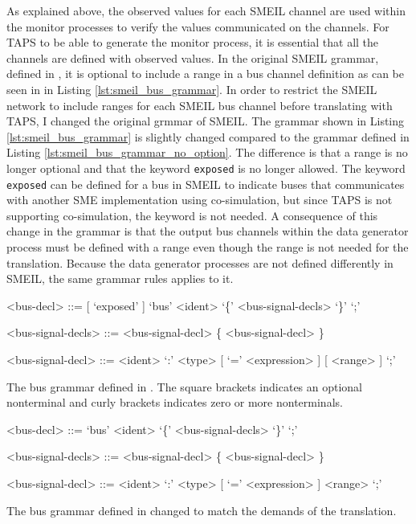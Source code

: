 As explained above, the observed values for each SMEIL channel are used within the monitor processes to verify the values communicated on the channels. For TAPS to be able to generate the monitor process, it is essential that all the channels are defined with observed values. In the original SMEIL grammar, defined in \cite{Asheim2018}, it is optional to include a range in a bus channel definition as can be seen in in Listing \ref{lst:smeil_bus_grammar}.
In order to restrict the SMEIL network to include ranges for each SMEIL bus channel before translating with TAPS, I changed the original grmmar of SMEIL. The grammar shown in Listing \ref{lst:smeil_bus_grammar} is slightly changed compared to the grammar defined in Listing \ref{lst:smeil_bus_grammar_no_option}. The difference is that a range is no longer optional and that the keyword \texttt{exposed} is no longer allowed. The keyword \texttt{exposed} can be defined for a bus in SMEIL to indicate buses that communicates with another SME implementation using co-simulation, but since TAPS is not supporting co-simulation, the keyword is not needed. A consequence of this change in the grammar is that the output bus channels within the data generator process must be defined with a range even though the range is not needed for the translation. Because the data generator processes are not defined differently in SMEIL, the same grammar rules applies to it.
\begin{listing}
    \begin{grammar}
    <bus-decl> ::= [ `exposed' ] `bus' <ident> `\{' <bus-signal-decls> `\}'  `;'

    <bus-signal-decls> ::= <bus-signal-decl> \{ <bus-signal-decl> \}

    <bus-signal-decl> ::= <ident> `:' <type> [ `=' <expression> ] [ <range> ] `;'
    \end{grammar}
    \caption{The bus grammar defined in \cite{Asheim2018}. The square brackets indicates an optional nonterminal and curly brackets indicates zero or more nonterminals.}
    \label{lst:smeil_bus_grammar}
\end{listing}
\begin{listing}
    \begin{grammar}
    <bus-decl> ::= `bus' <ident> `\{' <bus-signal-decls> `\}'  `;'

    <bus-signal-decls> ::= <bus-signal-decl> \{ <bus-signal-decl> \}

    <bus-signal-decl> ::= <ident> `:' <type> [ `=' <expression> ] <range> `;'
    \end{grammar}
    \caption{The bus grammar defined in \cite{Asheim2018} changed to match the demands of the translation.}
    \label{lst:smeil_bus_grammar_no_option}
\end{listing}
